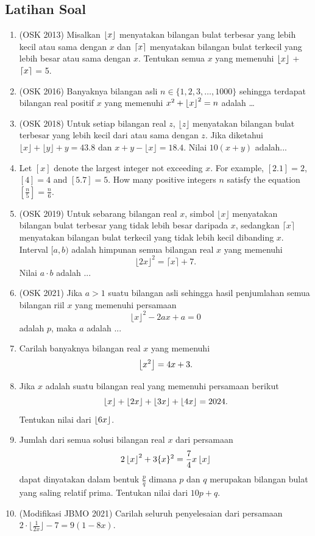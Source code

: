 \documentclass[12pt]{scrartcl}
\begin{document}
\subsection{Latihan Soal}
\begin{enumerate}
    \item (OSK 2013) Misalkan $\left\lfloor x \right\rfloor$ menyatakan bilangan bulat terbesar yang lebih kecil atau sama dengan $x$ dan $\left\lceil x \right\rceil$ menyatakan bilangan bulat terkecil yang lebih besar atau sama dengan $x$. Tentukan semua $x$ yang memenuhi $\left\lfloor x \right\rfloor$ + $\left\lceil x \right\rceil$ = 5.
    
    \item (OSK 2016) Banyaknya bilangan asli $n \in \{1,2,3,\dots,1000\}$ sehingga terdapat bilangan real positif $x$ yang memenuhi $x^2+\left\lfloor x \right\rfloor^2=n$ adalah \dots
    
    \item (OSK 2018) Untuk setiap bilangan real $z$, $\lfloor z \rfloor$ menyatakan bilangan bulat terbesar yang lebih kecil dari atau sama dengan $z$. Jika diketahui $\lfloor x \rfloor + \lfloor y \rfloor + y = 43.8$ dan $x + y - \lfloor x \rfloor = 18.4$. Nilai $10(x + y)$ adalah...
    
    \item Let $[x]$ denote the largest integer not exceeding $x$. For example, $[2.1]=2$, $[4]=4$ and $[5.7]=5$. How many positive integers $n$ satisfy the equation $\left[\frac{n}{5}\right]=\frac{n}{6}$.

    \item (OSK 2019) Untuk sebarang bilangan real $x$, simbol $\lfloor x \rfloor$ menyatakan bilangan bulat terbesar yang tidak lebih besar daripada $x$, sedangkan $\lceil x \rceil$ menyatakan bilangan bulat terkecil yang tidak lebih kecil dibanding $x$. Interval $[a, b)$ adalah himpunan semua bilangan real $x$ yang memenuhi
    $$\lfloor 2x \rfloor^2 = \lceil x \rceil + 7.$$
    Nilai $a \cdot b$ adalah ...

    \item (OSK 2021) Jika $a > 1$ suatu bilangan asli sehingga hasil penjumlahan semua bilangan riil $x$ yang memenuhi persamaan
    $$\lfloor x \rfloor^2 - 2ax + a = 0$$
    adalah $p$, maka $a$ adalah ...

    \item Carilah banyaknya bilangan real $x$ yang memenuhi
    $$\left\lfloor x^2 \right\rfloor=4x+3.$$

    \item Jika $x$ adalah suatu bilangan real yang memenuhi persamaan berikut
    $$\left\lfloor x \right\rfloor+\left\lfloor 2x \right\rfloor+\left\lfloor 3x \right\rfloor+\left\lfloor 4x \right\rfloor=2024.$$
    Tentukan nilai dari $\left\lfloor 6x \right\rfloor$.

    \item Jumlah dari semua solusi bilangan real $x$ dari persamaan
    $$2\left\lfloor x \right\rfloor^2+3\{x\}^2=\frac{7}{4}x\left\lfloor x \right\rfloor$$
    dapat dinyatakan dalam bentuk $\frac{p}{q}$ dimana $p$ dan $q$ merupakan bilangan bulat yang saling relatif prima. Tentukan nilai dari $10p+q$.

    
    \item (Modifikasi JBMO 2021) Carilah seluruh penyelesaian dari persamaan $2\cdot \lfloor{\frac{1}{2x}}\rfloor - 7 = 9(1 - 8x)$.
\end{enumerate}
\end{document}
